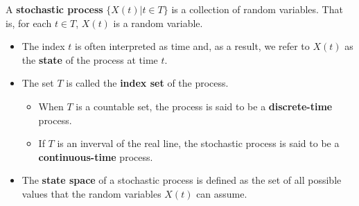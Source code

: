 \begin{definition}
    A \textbf{stochastic process} $\{X(t)| t \in T\}$ is a collection of random variables. That is, for each $t \in T$, $X(t)$ is a random variable. 
    
    \begin{itemize}
        \item The index $t$ is often interpreted as time and, as a result, we refer to $X(t)$ as the \textbf{state} of the process at time $t$. 
        \item The set $T$ is called the \textbf{index set} of the process. 
        \begin{itemize}
            \item When $T$ is a countable set, the process is said to be a \textbf{discrete-time} process.
            \item If $T$ is an inverval of the real line, the stochastic process is said to be a \textbf{continuous-time} process.
        \end{itemize}
        \item The \textbf{state space} of a stochastic process is defined as the set of all possible values that the random variables $X(t)$ can assume.
    \end{itemize}
    
\end{definition}

